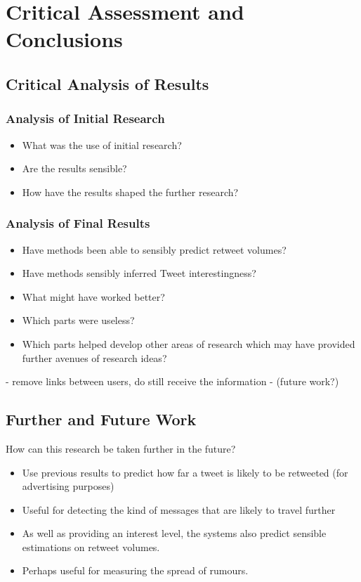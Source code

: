 \chapter{Critical Assessment and Conclusions}


\section{Critical Analysis of Results}
\subsection{Analysis of Initial Research}
\begin{itemize}
\item What was the use of initial research?
\item Are the results sensible?
\item How have the results shaped the further research?
\end{itemize}

\subsection{Analysis of Final Results}
\begin{itemize}
\item Have methods been able to sensibly predict retweet volumes?
\item Have methods sensibly inferred Tweet interestingness?
\item What might have worked better?
\item Which parts were useless?
\item Which parts helped develop other areas of research which may have provided further avenues of research ideas?
\end{itemize}

- remove links between users, do still receive the information - (future work?)

\section{Further and Future Work}
How can this research be taken further in the future?

\begin{itemize}
\item Use previous results to predict how far a tweet is likely to be retweeted (for advertising purposes)
\item Useful for detecting the kind of messages that are likely to travel further
\item As well as providing an interest level, the systems also predict sensible estimations on retweet volumes.
\item Perhaps useful for measuring the spread of rumours.
\end{itemize}

